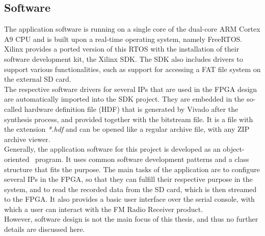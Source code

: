 \subsection{Software}

The application software is running on a single core of the dual-core ARM Cortex A9 CPU and is built upon a real-time operating system, namely FreeRTOS.
Xilinx provides a ported version of this RTOS with the installation of their software development kit, the Xilinx SDK.
The SDK also includes drivers to support various functionalities, such as support for accessing a FAT file system on the external SD card.\\

The respective software drivers for several IPs that are used in the FPGA design are automatically imported into the SDK project.
They are embedded in the so-called hardware definition file (HDF) that is generated by Vivado after the synthesis process, and provided together with the bitstream file.
It is a file with the extension \textit{*.hdf} and can be opened like a regular archive file, with any ZIP archive viewer.\\

Generally, the application software for this project is developed as an object-oriented \cplusplus\ program.
It uses common software development patterns and a class structure that fits the purpose.
The main tasks of the application are to configure several IPs in the FPGA, so that they can fulfill their respective purpose in the system, and to read the recorded data from the SD card, which is then streamed to the FPGA.
It also provides a basic user interface over the serial console, with which a user can interact with the FM Radio Receiver product.\\

However, software design is not the main focus of this thesis, and thus no further details are discussed here.
